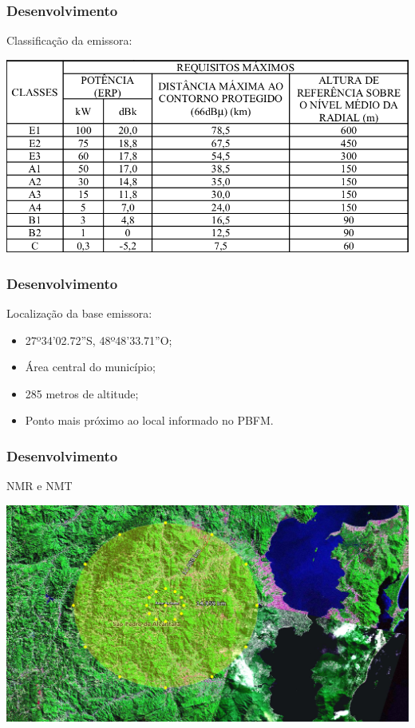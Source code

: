 \documentclass{beamer}
\begin{document}
        \begin{frame}
    
      \frametitle{Desenvolvimento}
      
      
	 Classificação da emissora:
      \begin{center}
      
           \includegraphics[width=.8\linewidth]{figs/tabelaClassificacaoEmissoras.png}		  		
        \end{center}
      
        
  
	\end{frame}
    
    \begin{frame}
    
      \frametitle{Desenvolvimento}
      
          Localização da base emissora:
	\begin{itemize}
	

	  \item 27º34'02.72''S, 48º48'33.71''O;
	  \item Área central do município;
	  \item 285 metros de altitude;
	  \item Ponto mais próximo ao local informado no PBFM.
      
      \end{itemize}
  
    \end{frame}
    
    \begin{frame}
    
      \frametitle{Desenvolvimento}
      NMR e NMT
      \begin{center}
      
           \includegraphics[width=.8\linewidth]{figs/radiais_detalhado.png}		  		
        \end{center}
  
      \end{frame}
    
\end{document}
